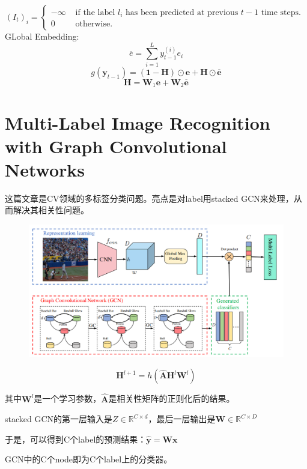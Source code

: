 \documentclass[a4paper,UTF8]{article}
\numberwithin{equation}{section}
\begin{document}
	\begin{equation}
	\left(I_{t}\right)_{i}=\left\{\begin{array}{ll}{-\infty} & {\text { if the label } l_{i} \text { has been predicted at previous } t-1 \text { time steps. }} \\ {0} & {\text { otherwise. }}\end{array}\right.
	\end{equation}
GLobal Embedding:
\begin{equation}
	\overline{e}=\sum_{i=1}^{L} y_{t-1}^{(i)} e_{i}
	\end{equation}
	\begin{equation}
		g\left(\boldsymbol{y}_{t-1}\right)=(\mathbf{1}-\boldsymbol{H}) \odot \boldsymbol{e}+\boldsymbol{H} \odot \overline{\boldsymbol{e}}
		\end{equation}
		\begin{equation}
			\boldsymbol{H}=\boldsymbol{W}_{1} \boldsymbol{e}+\boldsymbol{W}_{2} \overline{\boldsymbol{e}}
			\end{equation}


\newpage
\section{Multi-Label Image Recognition with Graph Convolutional Networks}
这篇文章是CV领域的多标签分类问题。亮点是对label用stacked GCN来处理，从而解决其相关性问题。
\begin{figure}[H]
	\centering
	\includegraphics[width=\textwidth]{10-1.png}
\end{figure}
\begin{equation}
	\boldsymbol{H}^{l+1}=h\left(\widehat{\boldsymbol{A}} \boldsymbol{H}^{l} \boldsymbol{W}^{l}\right)
	\end{equation}

	其中$\boldsymbol{W}^l$是一个学习参数，$\widehat{\boldsymbol{A}}$是相关性矩阵的正则化后的结果。

	stacked GCN的第一层输入是$Z \in \mathbb{R}^{C \times d}$，最后一层输出是$\boldsymbol{W} \in \mathbb{R}^{C \times D}$

	于是，可以得到C个label的预测结果：$\hat{\boldsymbol{y}}=\boldsymbol{W} \boldsymbol{x}$

	GCN中的C个node即为C个label上的分类器。
\end{document}
